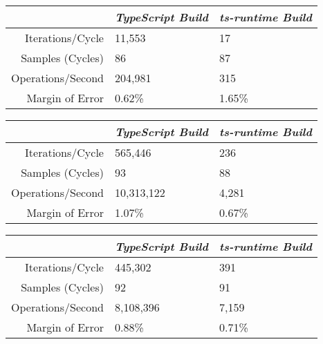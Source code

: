 \begin{center}
{
\centering
\tabulinesep=1.2mm
\setlength{\tabcolsep}{5mm}
\def\arraystretch{1.25}
\small
\begin{tabu} to \textwidth {|r||X[c,m]|X[c,m]|}
  \hline
  & \emph{TypeScript Build} & \emph{ts-runtime Build} \\
  \hline
  \hline
  Iterations/Cycle  & 11,553 & 17 \\
  \hline
  Samples (Cycles)  & 86 & 87 \\
  \hline
  Operations/Second & 204,981 & 315 \\
  \hline
  Margin of Error   & 0.62\% & 1.65\% \\
  \hline
\end{tabu}
}
\end{center}

\begin{center}
{
\centering
\tabulinesep=1.2mm
\setlength{\tabcolsep}{5mm}
\def\arraystretch{1.25}
\small
\begin{tabu} to \textwidth {|r||X[c,m]|X[c,m]|}
  \hline
  & \emph{TypeScript Build} & \emph{ts-runtime Build} \\
  \hline
  \hline
  Iterations/Cycle  & 565,446 & 236 \\
  \hline
  Samples (Cycles)  & 93 & 88 \\
  \hline
  Operations/Second & 10,313,122 & 4,281 \\
  \hline
  Margin of Error   & 1.07\% & 0.67\% \\
  \hline
\end{tabu}
}
\end{center}

\begin{center}
{
\centering
\tabulinesep=1.2mm
\setlength{\tabcolsep}{5mm}
\def\arraystretch{1.25}
\small
\begin{tabu} to \textwidth {|r||X[c,m]|X[c,m]|}
  \hline
  & \emph{TypeScript Build} & \emph{ts-runtime Build} \\
  \hline
  \hline
  Iterations/Cycle  & 445,302 & 391 \\
  \hline
  Samples (Cycles)  & 92 & 91 \\
  \hline
  Operations/Second & 8,108,396 & 7,159 \\
  \hline
  Margin of Error   & 0.88\% & 0.71\% \\
  \hline
\end{tabu}
}
\end{center}

